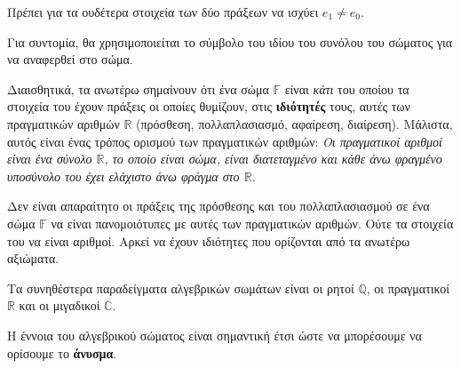 \documentclass[main.tex]{subfiles}
\begin{document}
 	\begin{remark}
 		Πρέπει για τα ουδέτερα στοιχεία των δύο πράξεων να ισχύει ${e_1 \neq e_0}$.
 	\end{remark}
 	
 	Για συντομία, θα χρησιμοποιείται το σύμβολο του ιδίου του συνόλου του σώματος για να αναφερθεί στο σώμα.
 	
 	Διαισθητικά, τα ανωτέρω σημαίνουν ότι ένα σώμα $\mathbb{F}$ είναι \textit{κάτι} του οποίου  τα στοιχεία του έχουν πράξεις οι οποίες θυμίζουν, στις \textbf{ιδιότητές} τους, αυτές των πραγματικών αριθμών $\mathbb{R}$ (πρόσθεση, πολλαπλασιασμό, αφαίρεση, διαίρεση). Μάλιστα, αυτός είναι ένας τρόπος ορισμού των πραγματικών αριθμών:
 	\textit{Οι πραγματικοί αριθμοί είναι ένα σύνολο $\mathbb{R}$, το οποίο είναι σώμα, είναι διατεταγμένο και κάθε άνω φραγμένο υποσύνολο του έχει ελάχιστο άνω φράγμα στο $\mathbb{R}$.}
 	
 	Δεν είναι απαραίτητο οι πράξεις της πρόσθεσης και του πολλαπλασιασμού σε ένα σώμα $\mathbb{F}$ να είναι πανομοιότυπες με αυτές των πραγματικών αριθμών. Ούτε τα στοιχεία του να είναι αριθμοί. Αρκεί να έχουν ιδιότητες που ορίζονται από τα ανωτέρω αξιώματα.
 	
 	Τα συνηθέστερα παραδείγματα αλγεβρικών σωμάτων είναι οι ρητοί $\mathbb{Q}$, οι πραγματικοί $\mathbb{R}$ και οι μιγαδικοί $\mathbb{C}$.
 	
 	H έννοια του αλγεβρικού σώματος είναι σημαντική έτσι ώστε να μπορέσουμε να ορίσουμε το \textbf{άνυσμα}.
\end{document}
